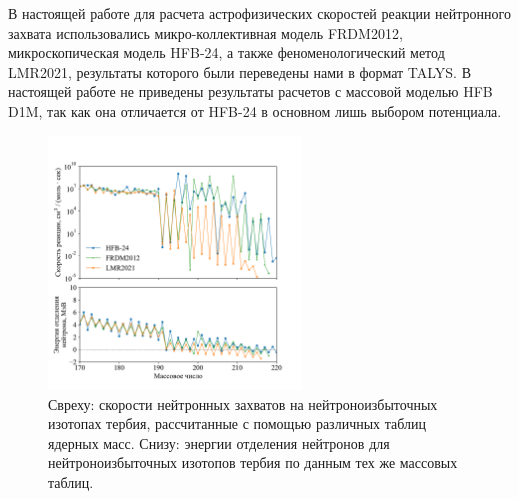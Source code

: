 В настоящей работе для расчета астрофизических скоростей реакции нейтронного захвата использовались микро-коллективная модель FRDM2012, микроскопическая модель HFB-24, а также феноменологический метод LMR2021, результаты которого были переведены нами в формат TALYS. В настоящей работе не приведены результаты расчетов с массовой моделью HFB D1M, так как она отличается от HFB-24 в основном лишь выбором потенциала.

\begin{figure}
  \centering
  \includegraphics[width=0.6\textwidth]{pics/rates_vs_A_tb.pdf}
  \caption{Свреху: скорости нейтронных захватов на нейтроноизбыточных изотопах тербия, рассчитанные с помощью различных таблиц ядерных масс. Снизу: энергии отделения нейтронов для нейтроноизбыточных изотопов тербия по данным тех же массовых таблиц.}
  \label{fig:rates_vs_A}
\end{figure}

